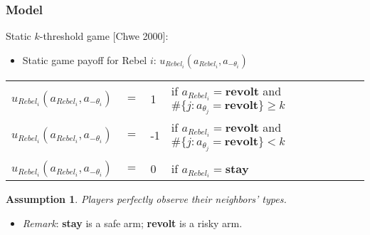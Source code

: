 \documentclass[9pt]{beamer}
\newtheorem{assumption}{Assumption}[section]
\begin{document}
\begin{frame}[label=static_game]
  \frametitle{Model}
Static $k$-threshold game [Chwe 2000]: \hyperlink{alt_static_game}{}

  \begin{itemize}
  \item Static game payoff for Rebel $i$: $u_{Rebel_i}(a_{Rebel_i},a_{-\theta_i})$

\end{itemize}
  \begin{table}[h]
\begin{tabular}{llll}
$u_{Rebel_i}(a_{Rebel_i},a_{-\theta_i})$ & $=$ & 1 & if $a_{Rebel_i}=\textbf{revolt}$ and $\#\{j:a_{\theta_j}=\textbf{revolt}\}\geq k$ \\
$u_{Rebel_i}(a_{Rebel_i},a_{-\theta_i})$ & $=$ & -1 & if $a_{Rebel_i}=\textbf{revolt}$ and $\#\{j:a_{\theta_j}=\textbf{revolt}\}< k$ \pause \\
\\
$u_{Rebel_i}(a_{Rebel_i},a_{-\theta_i})$ & $=$ & 0 & if $a_{Rebel_i}=\textbf{stay}$ \pause \\
\end{tabular}

\end{table}

\begin{assumption}

Players perfectly observe their neighbors' types.

\end{assumption}

 \begin{itemize}
 \item \textit{Remark}: \textbf{stay} is a safe arm; \textbf{revolt} is a risky arm.
 \end{itemize}

\end{frame}
\end{document}
